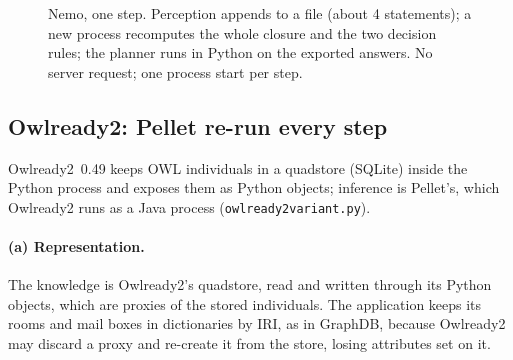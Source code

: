 \documentclass[10pt]{article}
\newcommand{\brkunderscore}{\textunderscore\allowbreak}
\newcommand{\code}[1]{{\let\_\brkunderscore\texttt{#1}}}
\newcommand{\file}[1]{{\let\_\brkunderscore\texttt{#1}}}
\def\cA{1.55}\def\cB{4.05}\def\cC{6.55}\def\cD{9.05}\def\cE{11.55}\def\cF{14.05}
\def\yP{0.85}\def\yX{-1.5}
\newcommand{\headers}[6]{%
  \node[head] at (\cA,2.45) {#1}; \node[head] at (\cB,2.45) {#2}; \node[head] at (\cC,2.45) {#3};
  \node[head] at (\cD,2.45) {#4}; \node[head] at (\cE,2.45) {#5}; \node[head] at (\cF,2.45) {#6};}
\newcommand{\pylane}[1]{%
  \draw[lane=pyline, fill=pyfill] (0,0) rectangle (15.4,2.15);
  \node[lanelabel, text=pyline] at (0,2.15) {#1};}
\newcommand{\exlane}[2][solid]{%
  \draw[lane=exline, fill=exfill, #1] (0,-2.8) rectangle (15.4,-0.55);
  \node[lanelabel, text=exline, anchor=south west] at (0,-2.8) {#2};}
\newcommand{\tagS}[1]{\node[badge=tagS, anchor=south east] at ([xshift=-1pt,yshift=1pt]#1.north east) {S};}
\newcommand{\tagMP}[1]{\node[badge=tagP, anchor=south east] at ([xshift=-1pt,yshift=1pt]#1.north east) {P};
  \node[badge=tagM, anchor=south east] at ([xshift=-10pt,yshift=1pt]#1.north east) {M};}
\begin{document}
\begin{figure}[t]
\centering
{}
\caption{Nemo, one step. Perception appends to a file (about 4 statements); a new process recomputes the whole closure
and the two decision rules; the planner runs in Python on the exported answers. No server request; one process start
per step.}
\label{fig:nemo}
\end{figure}

\subsection{Owlready2: Pellet re-run every step}
\label{sec:owlready2}

Owlready2~0.49 keeps OWL individuals in a quadstore (SQLite) inside the Python process and exposes them as Python
objects; inference is Pellet's, which Owlready2 runs as a Java process (\file{owlready2\_variant.py}).

\paragraph{(a) Representation.} The knowledge is Owlready2's quadstore, read and written through its Python objects,
which are proxies of the stored individuals. The application keeps its rooms and mail boxes in dictionaries by IRI, as
in GraphDB, because Owlready2 may discard a proxy and re-create it from the store, losing attributes set on it.
\end{document}
